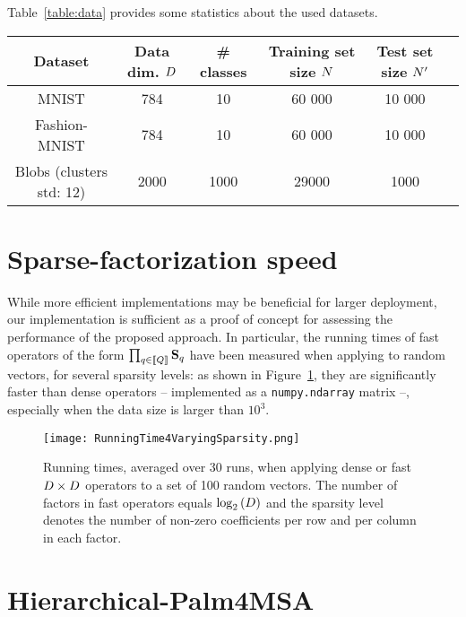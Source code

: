 Table~\ref{table:data} provides some statistics about the used datasets.

\begin{table*}[!h]
\centering
\begin{tabular}{|c|c|c|c|c|c|}
\hline
\textbf{Dataset} & \textbf{Data dim.} $D$        & \textbf{\# classes} & \textbf{Training set size} $N$ & \textbf{Test set size} $N'$ \\ \hline
MNIST                   & 784   & 10        & 60 000    & 10 000               \\ \hline
Fashion-MNIST           & 784   & 10        & 60 000    & 10 000               \\ \hline
Blobs (clusters std: 12)   & 2000  & 1000      & 29000      & 1000               \\ \hline
\end{tabular}
\caption{Datasets statistics}
\label{table:data}
\end{table*}

\section{Sparse-factorization speed}
\label{seq:sparse_factor_benchmarking}
While more efficient implementations may be beneficial for larger deployment, our implementation is sufficient as a proof of concept for assessing the performance of the proposed approach. 
In particular, the running times of fast operators of the form $\prod_{q\in\left \llbracket Q\right \rrbracket}{{\mathbf{S}}_q}$ have been measured when applying to random vectors, for several sparsity levels: 
as shown in Figure~\ref{fig:time_csr}, they are significantly faster than dense operators -- implemented as a \texttt{numpy.ndarray} matrix --, especially when the data size is larger than $10^3$.
\begin{figure}[tbh]
\centering
\texttt{[image: RunningTime4VaryingSparsity.png]}
\caption{Running times, averaged over 30 runs, when applying dense or fast $D \times D$ operators to a set of 100 random vectors. The number of factors in fast operators equals $\log_2\left (D\right )$ and the sparsity level denotes the number of non-zero coefficients per row and per column in each factor.}
\label{fig:time_csr}
\end{figure}

\section{Hierarchical-Palm4MSA}


